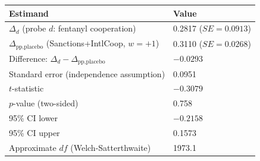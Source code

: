 
\begin{tabular}[t]{ll}
\toprule
Estimand & Value\\
\midrule
$\Delta_d$ (probe $d$: fentanyl cooperation) & 0.2817 ($SE = 0.0913$)\\
$\Delta_{\text{pp,placebo}}$ (Sanctions+IntlCoop, $w{=}+1$) & 0.3110 ($SE = 0.0268$)\\
Difference: $\Delta_d - \Delta_{\text{pp,placebo}}$ & $-0.0293$\\
Standard error (independence assumption) & 0.0951\\
$t$-statistic & $-0.3079$\\
$p$-value (two-sided) & 0.758\\
95\% CI lower & $-0.2158$\\
95\% CI upper & 0.1573\\
Approximate $df$ (Welch-Satterthwaite) & 1973.1\\
\bottomrule
\end{tabular}
